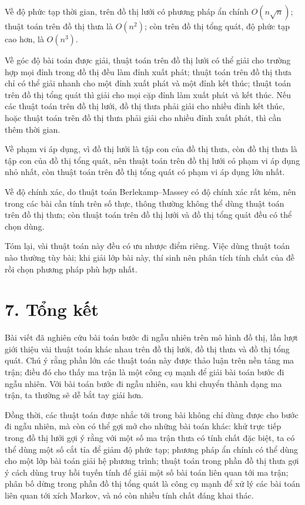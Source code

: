 \documentclass[11pt]{article}
\begin{document}
Về độ phức tạp thời gian, trên đồ thị lưới có phương pháp ẩn chính
\(O(n\sqrt n)\); thuật toán trên đồ thị thưa là \(O(n^2)\); còn trên đồ thị
tổng quát, độ phức tạp cao hơn, là \(O(n^3)\).

Về góc độ bài toán được giải, thuật toán trên đồ thị lưới có thể giải cho
trường hợp mọi đỉnh trong đồ thị đều làm đỉnh xuất phát; thuật toán trên đồ
thị thưa chỉ có thể giải nhanh cho một đỉnh xuất phát và một đỉnh kết thúc;
thuật toán trên đồ thị tổng quát thì giải cho mọi cặp đỉnh làm xuất phát và
kết thúc. Nếu các thuật toán trên đồ thị lưới, đồ thị thưa phải giải cho nhiều
đỉnh kết thúc, hoặc thuật toán trên đồ thị thưa phải giải cho nhiều đỉnh xuất
phát, thì cần thêm thời gian.

Về phạm vi áp dụng, vì đồ thị lưới là tập con của đồ thị thưa, còn đồ thị thưa
là tập con của đồ thị tổng quát, nên thuật toán trên đồ thị lưới có phạm vi áp
dụng nhỏ nhất, còn thuật toán trên đồ thị tổng quát có phạm vi áp dụng lớn
nhất.

Về độ chính xác, do thuật toán Berlekamp--Massey có độ chính xác rất kém, nên
trong các bài cần tính trên số thực, thông thường không thể dùng thuật toán
trên đồ thị thưa; còn thuật toán trên đồ thị lưới và đồ thị tổng quát đều có
thể chọn dùng.

Tóm lại, vài thuật toán này đều có ưu nhược điểm riêng. Việc dùng thuật toán
nào thường tùy bài; khi giải lớp bài này, thí sinh nên phân tích tính chất của
đề rồi chọn phương pháp phù hợp nhất.

\section*{7. Tổng kết}

Bài viết đã nghiên cứu bài toán bước đi ngẫu nhiên trên mô hình đồ thị, lần
lượt giới thiệu vài thuật toán khác nhau trên đồ thị lưới, đồ thị thưa và đồ
thị tổng quát. Chú ý rằng phần lớn các thuật toán này được thảo luận trên nền
tảng ma trận; điều đó cho thấy ma trận là một công cụ mạnh để giải bài toán
bước đi ngẫu nhiên. Với bài toán bước đi ngẫu nhiên, sau khi chuyển thành dạng
ma trận, ta thường sẽ dễ bắt tay giải hơn.

Đồng thời, các thuật toán được nhắc tới trong bài không chỉ dùng được cho bước
đi ngẫu nhiên, mà còn có thể gợi mở cho những bài toán khác: khử trực tiếp
trong đồ thị lưới gợi ý rằng với một số ma trận thưa có tính chất đặc biệt, ta
có thể dùng một số cắt tỉa để giảm độ phức tạp; phương pháp ẩn chính có thể
dùng cho một lớp bài toán giải hệ phương trình; thuật toán trong phần đồ thị
thưa gợi ý cách dùng truy hồi tuyến tính để giải một số bài toán liên quan tới
ma trận; phân bố dừng trong phần đồ thị tổng quát là công cụ mạnh để xử lý các
bài toán liên quan tới xích Markov, và nó còn nhiều tính chất đáng khai thác.
\end{document}
